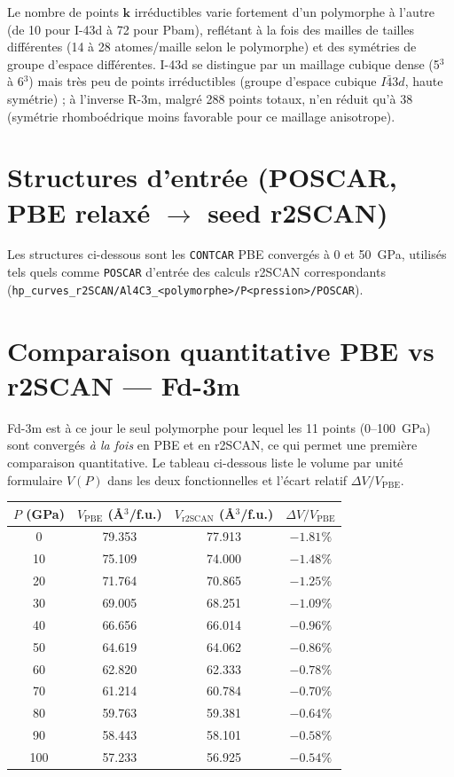 \documentclass[11pt,a4paper]{article}
\begin{document}
Le nombre de points $\mathbf{k}$ irréductibles varie fortement d'un polymorphe à l'autre (de 10
pour I-43d à 72 pour Pbam), reflétant à la fois des mailles de tailles différentes (14 à 28
atomes/maille selon le polymorphe) et des symétries de groupe d'espace différentes. I-43d se
distingue par un maillage cubique dense (5$^3$ à 6$^3$) mais très peu de points irréductibles
(groupe d'espace cubique $I\bar43d$, haute symétrie) ; à l'inverse R-3m, malgré 288 points
totaux, n'en réduit qu'à 38 (symétrie rhomboédrique moins favorable pour ce maillage
anisotrope).

\section{Structures d'entrée (POSCAR, PBE relaxé $\to$ seed r2SCAN)}

Les structures ci-dessous sont les \texttt{CONTCAR} PBE convergés à 0 et 50~GPa, utilisés tels
quels comme \texttt{POSCAR} d'entrée des calculs r2SCAN correspondants
(\texttt{hp\_curves\_r2SCAN/Al4C3\_<polymorphe>/P<pression>/POSCAR}).



\section{Comparaison quantitative PBE vs r2SCAN --- Fd-3m}
\label{sec:fd3m-comparison}

Fd-3m est à ce jour le seul polymorphe pour lequel les 11 points (0--100~GPa) sont convergés
\emph{à la fois} en PBE et en r2SCAN, ce qui permet une première comparaison quantitative. Le
tableau ci-dessous liste le volume par unité formulaire $V(P)$ dans les deux fonctionnelles et
l'écart relatif $\Delta V/V_{\text{PBE}}$.

\begin{center}
\begin{tabular}{cccc}
\toprule
$P$ (GPa) & $V_{\text{PBE}}$ (\AA$^3$/f.u.) & $V_{\text{r2SCAN}}$ (\AA$^3$/f.u.) & $\Delta V/V_{\text{PBE}}$ \\
\midrule
0   & 79.353 & 77.913 & $-1.81\%$ \\
10  & 75.109 & 74.000 & $-1.48\%$ \\
20  & 71.764 & 70.865 & $-1.25\%$ \\
30  & 69.005 & 68.251 & $-1.09\%$ \\
40  & 66.656 & 66.014 & $-0.96\%$ \\
50  & 64.619 & 64.062 & $-0.86\%$ \\
60  & 62.820 & 62.333 & $-0.78\%$ \\
70  & 61.214 & 60.784 & $-0.70\%$ \\
80  & 59.763 & 59.381 & $-0.64\%$ \\
90  & 58.443 & 58.101 & $-0.58\%$ \\
100 & 57.233 & 56.925 & $-0.54\%$ \\
\bottomrule
\end{tabular}
\end{center}
\end{document}
